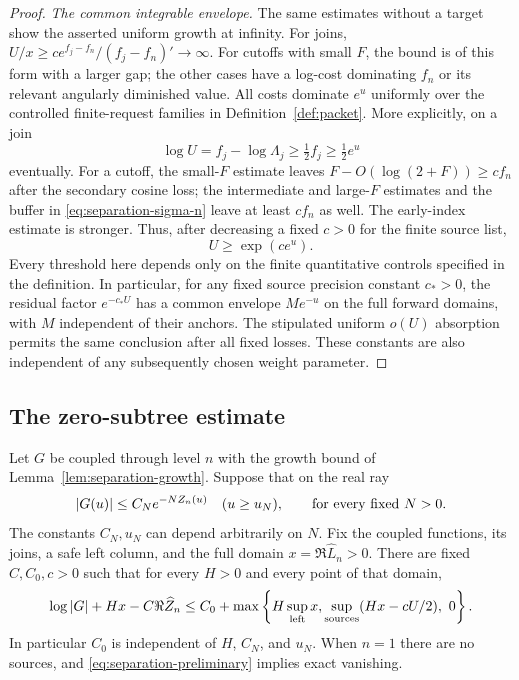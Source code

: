 \begin{proof}
\emph{The common integrable envelope.}
The same estimates without a target show the asserted uniform
growth at infinity.  For joins,
$U/x\geq ce^{f_j-f_n}/(f_j-f_n)'\to\infty$.
For cutoffs with small $F$, the bound is of this form with a
larger gap; the other cases have a log-cost dominating $f_n$
or its relevant angularly diminished value.  All costs dominate
$e^u$ uniformly over the controlled finite-request families in
Definition~\ref{def:packet}.  More explicitly, on a join
\[
 \log U=f_j-\log\Lambda_j\geq\tfrac12 f_j
                         \geq\tfrac12 e^u
\]
eventually.  For a cutoff, the small-$F$ estimate leaves
$F-O(\log(2+F))\geq c f_n$ after the secondary cosine loss;
the intermediate and large-$F$ estimates and the buffer in
\eqref{eq:separation-sigma-n} leave at least $c f_n$ as well.
The early-index estimate is stronger.  Thus, after decreasing
a fixed $c>0$ for the finite source list,
\begin{equation}\label{eq:separation-uniform-source-envelope}
 U\geq\exp(c e^u).
\end{equation}
Every threshold here depends only on the finite quantitative
controls specified in the definition.  In particular, for any
fixed source precision constant $c_*>0$, the residual factor
$e^{-c_*U}$ has a common envelope $M e^{-u}$ on the full
forward domains, with $M$ independent of their anchors.
The stipulated uniform $o(U)$ absorption permits the same
conclusion after all fixed losses.  These constants are also
independent of any subsequently chosen weight parameter.
\end{proof}

\subsection{The zero-subtree estimate}

\begin{lemma}\label{lem:separation-weighted}
Let $G$ be coupled through level $n$ with the growth bound of
Lemma~\ref{lem:separation-growth}.  Suppose that on the real ray
\begin{equation}\label{eq:separation-preliminary}
 |G(u)|\leq C_N e^{-NZ_n(u)}
 \quad(u\geq u_N),\qquad\hbox{for every fixed }N>0.
\end{equation}
The constants $C_N,u_N$ can depend arbitrarily on $N$.
Fix the coupled functions, its joins, a safe left column, and
the full domain $x=\Re\widehat L_n>0$.  There are fixed
$C,C_0,c>0$ such that for every $H>0$ and every point of that
domain,
\begin{equation}\label{eq:separation-weighted}
 \log|G|+Hx-C\Re\widehat Z_n
 \leq C_0+\max\left\{
 H\sup_{\rm left}x,
 \sup_{\rm sources}(Hx-cU/2),\ 0\right\}.
\end{equation}
In particular $C_0$ is independent of $H$, $C_N$, and $u_N$.
When $n=1$ there are no sources, and
\eqref{eq:separation-preliminary} implies exact vanishing.
\end{lemma}

